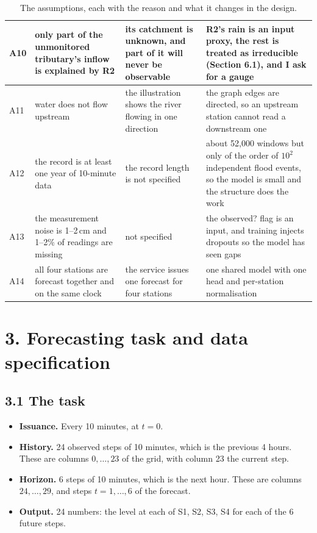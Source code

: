 \documentclass[11pt,letterpaper]{article}
\begin{document}
\begin{table}[H]
\begin{tabularx}{\textwidth}{@{}p{0.2in}p{2.15in}p{2.15in}X@{}}
\hline
A10 & only part of the unmonitored tributary's inflow is explained by R2 & its catchment is unknown, and part of it will never be observable & R2's rain is an input proxy, the rest is treated as irreducible (Section 6.1), and I ask for a gauge \\
\hline
A11 & water does not flow upstream & the illustration shows the river flowing in one direction & the graph edges are directed, so an upstream station cannot read a downstream one \\
\hline
A12 & the record is at least one year of 10-minute data & the record length is not specified & about 52{,}000 windows but only of the order of $10^2$ independent flood events, so the model is small and the structure does the work \\
\hline
A13 & the measurement noise is 1--2\,cm and 1--2\% of readings are missing & not specified & the observed? flag is an input, and training injects dropouts so the model has seen gaps \\
\hline
A14 & all four stations are forecast together and on the same clock & the service issues one forecast for four stations & one shared model with one head and per-station normalisation \\
\bottomrule
\end{tabularx}
\caption{The assumptions, each with the reason and what it changes in the design.}
\label{tab:assumptions}
\end{table}


\section*{3. Forecasting task and data specification}

\subsection*{3.1 The task}

\begin{itemize}
\item \textbf{Issuance.} Every 10 minutes, at $t=0$.
\item \textbf{History.} 24 observed steps of 10 minutes, which is the previous
4 hours. These are columns $0,\dots,23$ of the grid, with column 23 the current step.
\item \textbf{Horizon.} 6 steps of 10 minutes, which is the next hour. These are
columns $24,\dots,29$, and steps $t=1,\dots,6$ of the forecast.
\item \textbf{Output.} 24 numbers: the level at each of S1, S2, S3, S4 for each
of the 6 future steps.
\end{itemize}
\end{document}
